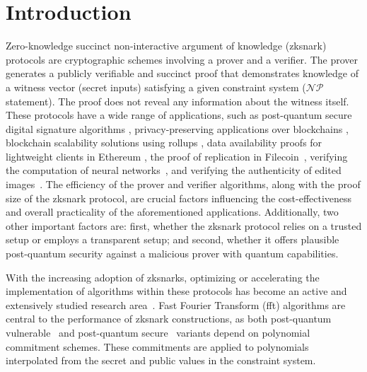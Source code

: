 \chapter{Introduction}
Zero-knowledge succinct non-interactive argument of knowledge (\gls{zksnark}) protocols are cryptographic schemes involving a prover and a verifier. The prover generates a publicly verifiable and succinct proof that demonstrates knowledge of a witness vector (secret inputs) satisfying a given constraint system ($\mathcal{NP}$ statement). The proof does not reveal any information about the witness itself. These protocols have a wide range of applications, such as post-quantum secure digital signature algorithms \cite{faest2023,picnic2017,Preon2023,picnic2018}, privacy-preserving applications over blockchains \cite{zcash-proc,Hawk,ZeeStar,ZEXE,williamson2018aztec}, blockchain scalability solutions using rollups \cite{Arun2024Jolt,Chaliasos2024,Thibault2022,PolygonZKEVM,zkSync,STARKnet}, data availability proofs for lightweight clients in Ethereum \cite{HallAndersen2024FRIDA}, the proof of replication in Filecoin~\cite{benet2017proof}, verifying the computation of neural networks~\cite{Haochen2024zkLLM,Chen2024ZKML,Weng2021Mystique}, and verifying the authenticity of edited images~\cite{Dziembowski2025VIMz}. 
The efficiency of the prover and verifier algorithms, along with the proof size of the  \gls{zksnark} protocol, are crucial factors influencing the cost-effectiveness and overall practicality of the aforementioned applications. Additionally, two other important factors are: first, whether the \gls{zksnark} protocol relies on a trusted setup or employs a transparent setup; and second, whether it offers plausible post-quantum security against a malicious prover with quantum capabilities.

With the increasing adoption of \glspl{zksnark}, optimizing or accelerating the implementation of algorithms within these protocols has become an active and extensively studied research area~\cite{ECFFT1_2023,ECFFT_2022,Diamond2023Towers,CHES:LuoFuGong23,Ji2024GPU,Jandhyala2024AirFRI}. Fast Fourier Transform (\gls{fft}) algorithms are central to the performance of \gls{zksnark} constructions, as both post-quantum vulnerable~\cite{Groth2016,Marlin2020,Bulletproofs2018,Gabizon2019PLONK,halo2-book} and post-quantum secure~\cite{Ames2017Ligero,Ben-Sasson2018STARK,Aurora2019,Chiesa2020Fractal,Polaris} variants depend on polynomial commitment schemes. These commitments are applied to polynomials interpolated from the secret and public values in the constraint system.

